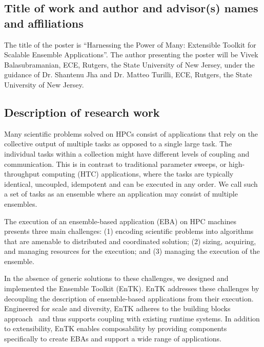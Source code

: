 \subsection{Title of work and author and advisor(s) names and affiliations}

The title of the poster is ``Harnessing the Power of Many: Extensible Toolkit 
for Scalable Ensemble Applications''. The author presenting the poster will be 
Vivek Balasubramanian, ECE, Rutgers, the State University of New Jersey, under 
the guidance of Dr. Shantenu Jha and Dr. Matteo Turilli, ECE, Rutgers, the State
University of New Jersey.

\subsection{Description of research work}

Many scientific problems solved on HPCs consist of applications that rely on the
collective output of multiple tasks as opposed to a single large task. The 
individual tasks within a collection might have different levels of coupling
and communication. This is in contrast to traditional parameter sweeps, or 
high-throughput computing (HTC) applications, where the tasks are typically
identical, uncoupled, idempotent and can be executed in any order. We call such
a set of tasks as an ensemble where an application may consist of multiple 
ensembles.

The execution of an ensemble-based application (EBA) on HPC machines presents 
three main challenges: (1) encoding scientific problems into algorithms that are 
amenable to distributed and coordinated solution; (2) sizing, acquiring, and 
managing resources for the execution; and (3) managing the execution of the 
ensemble.

In the absence of generic solutions to these challenges, we designed and 
implemented the Ensemble Toolkit (EnTK). EnTK addresses these challenges by 
decoupling the description of ensemble-based applications from their execution.
Engineered for scale and diversity, EnTK adheres to the building blocks 
approach~\cite{review_bb_2016} and thus supports coupling with existing runtime 
systems. In addition to extensibility, EnTK enables composability by providing 
components specifically to create EBAs
and support a wide range of applications.

